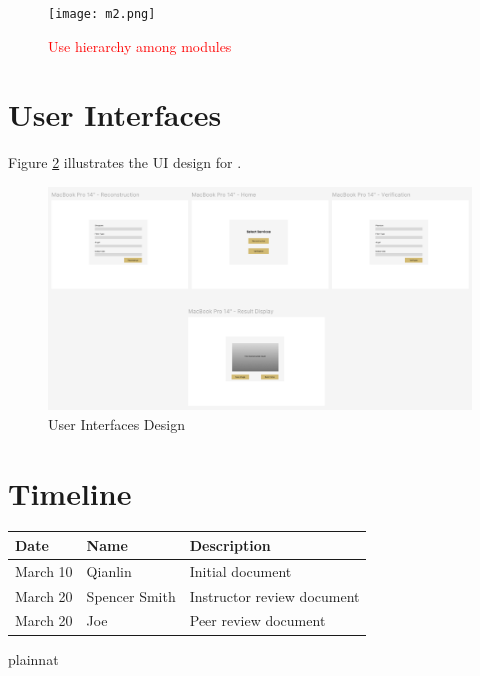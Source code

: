 \documentclass[12pt, titlepage]{article}
\newcommand{\add}{\textcolor{red}}
\begin{document}
\begin{figure}[H]
\centering
\texttt{[image: m2.png]}
\caption{\add{Use hierarchy among modules}}
\label{FigUH}
\end{figure}

\section{User Interfaces}
Figure \ref{FigUI} illustrates the UI design for \progname.
\begin{figure}[H]
\centering
\includegraphics[width=0.8\paperwidth]{UI.png}
\caption{User Interfaces Design}
\label{FigUI}
\end{figure}

\section{Timeline}
\begin{tabularx}{\textwidth}{p{3cm}p{2cm}X}
\toprule {\bf Date} & {\bf Name} & {\bf Description}\\
\midrule
March 10 & Qianlin & Initial document\\
March 20 & Spencer Smith & Instructor review document\\
March 20 & Joe & Peer review document\\
\bottomrule
\end{tabularx}

 {plainnat}


\newpage{}
\end{document}
